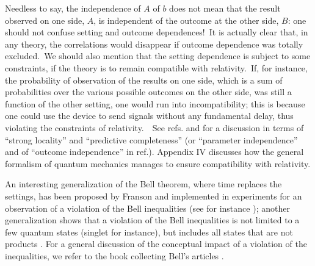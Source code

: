 \documentclass[12pt,onecolumn]{article}%
\begin{document}
Needless to say, the independence of $A$ of $b$ does not mean that the result
observed on one side, $A$, is independent of the outcome at the other side,
$B$: one should not confuse setting and outcome dependences!\ It is actually
clear that, in any theory, the correlations would disappear if outcome
dependence was totally excluded.\ We should also mention that the setting
dependence is subject to some constraints, if the theory is to remain
compatible with relativity.\ If, for instance, the probability of observation
of the results on one side, which is a sum of probabilities over the various
possible outcomes on the other side, was still a function of the other
setting, one would run into incompatibility; this is because one could use the
device to send signals without any fundamental delay, thus violating the
constraints of relativity.\ \ See refs. \cite{Jarrett} and
\cite{Ballentine-Jarrett} for a discussion in terms of ``strong locality'' and
``predictive completeness'' (or ``parameter independence'' and of ``outcome
independence'' in ref.\cite{Shimony-events}). Appendix IV discusses how the
general formalism of quantum mechanics manages to ensure compatibility with relativity.

An interesting generalization of the Bell theorem, where time replaces the
settings, has been proposed by Franson \cite{Franson} and implemented in
experiments for an observation of a violation of the Bell inequalities (see
for instance \cite{Brendel}); another generalization shows that a violation of
the Bell inequalities is not limited to a few quantum states (singlet for
instance), but includes all states that are not products \cite{Gisin}
\cite{Popescu-Rohrlich}. For a general discussion of the conceptual impact of
a violation of the inequalities, we refer to the book collecting Bell's
articles \cite{Bell-livre}.
\end{document}
